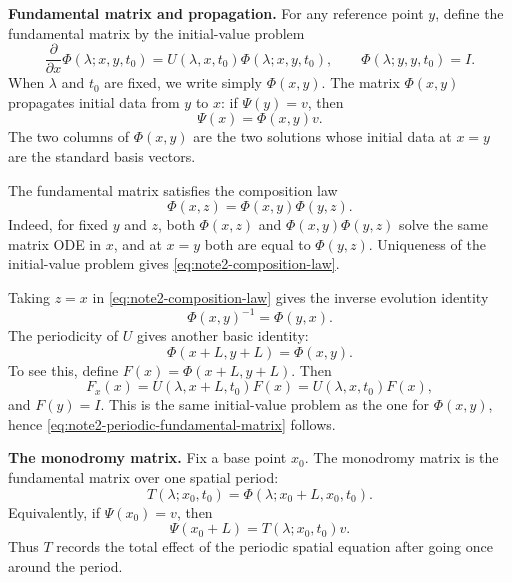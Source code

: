 \documentclass{amsart}
\newcounter{note}
\numberwithin{equation}{hw}
\newcommand{\noteheading}[1]{\vspace{1em}\noindent\textbf{#1}}
\begin{document}
\noteheading{Fundamental matrix and propagation.}
For any reference point \(y\), define the fundamental matrix by the
initial-value problem
\begin{equation}
\frac{\partial}{\partial x}\Phi(\lambda;x,y,t_0)
=
U(\lambda,x,t_0)\Phi(\lambda;x,y,t_0),
\qquad
\Phi(\lambda;y,y,t_0)=I.
\label{eq:note2-fundamental-matrix}
\end{equation}
When \(\lambda\) and \(t_0\) are fixed, we write simply
\(\Phi(x,y)\).  The matrix \(\Phi(x,y)\) propagates initial data from
\(y\) to \(x\): if \(\Psi(y)=v\), then
\begin{equation}
\Psi(x)=\Phi(x,y)v.
\label{eq:note2-propagator}
\end{equation}
The two columns of \(\Phi(x,y)\) are the two solutions whose initial
data at \(x=y\) are the standard basis vectors.

The fundamental matrix satisfies the composition law
\begin{equation}
\Phi(x,z)=\Phi(x,y)\Phi(y,z).
\label{eq:note2-composition-law}
\end{equation}
Indeed, for fixed \(y\) and \(z\), both
\(\Phi(x,z)\) and \(\Phi(x,y)\Phi(y,z)\) solve the same matrix ODE in
\(x\), and at \(x=y\) both are equal to \(\Phi(y,z)\).  Uniqueness of
the initial-value problem gives \eqref{eq:note2-composition-law}.

Taking \(z=x\) in \eqref{eq:note2-composition-law} gives the inverse
evolution identity
\begin{equation}
\Phi(x,y)^{-1}=\Phi(y,x).
\label{eq:note2-inverse-evolution}
\end{equation}
The periodicity of \(U\) gives another basic identity:
\begin{equation}
\Phi(x+L,y+L)=\Phi(x,y).
\label{eq:note2-periodic-fundamental-matrix}
\end{equation}
To see this, define \(F(x)=\Phi(x+L,y+L)\).  Then
\[
F_x(x)=U(\lambda,x+L,t_0)F(x)=U(\lambda,x,t_0)F(x),
\]
and \(F(y)=I\).  This is the same initial-value problem as the one for
\(\Phi(x,y)\), hence \eqref{eq:note2-periodic-fundamental-matrix}
follows.

\noteheading{The monodromy matrix.}
Fix a base point \(x_0\).  The monodromy matrix is the fundamental
matrix over one spatial period:
\begin{equation}
T(\lambda;x_0,t_0)
=
\Phi(\lambda;x_0+L,x_0,t_0).
\label{eq:note2-monodromy-definition}
\end{equation}
Equivalently, if \(\Psi(x_0)=v\), then
\begin{equation}
\Psi(x_0+L)=T(\lambda;x_0,t_0)v.
\label{eq:note2-monodromy-action}
\end{equation}
Thus \(T\) records the total effect of the periodic spatial equation
after going once around the period.
\end{document}

